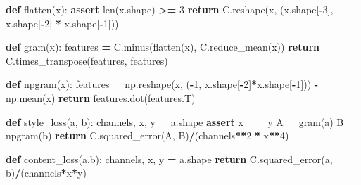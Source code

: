 \documentclass[]{book}
\newenvironment{Shaded}{\begin{snugshade}}{\end{snugshade}}
\newcommand{\KeywordTok}[1]{\textcolor[rgb]{0.13,0.29,0.53}{\textbf{#1}}}
\newcommand{\DecValTok}[1]{\textcolor[rgb]{0.00,0.00,0.81}{#1}}
\newcommand{\ControlFlowTok}[1]{\textcolor[rgb]{0.13,0.29,0.53}{\textbf{#1}}}
\newcommand{\OperatorTok}[1]{\textcolor[rgb]{0.81,0.36,0.00}{\textbf{#1}}}
\newcommand{\BuiltInTok}[1]{#1}
\newcommand{\NormalTok}[1]{#1}
\theoremstyle{definition}
\theoremstyle{definition}
\theoremstyle{definition}
\theoremstyle{remark}
\begin{document}
\begin{Shaded}
\begin{Highlighting}[]
\KeywordTok{def}\NormalTok{ flatten(x):}
    \ControlFlowTok{assert} \BuiltInTok{len}\NormalTok{(x.shape) }\OperatorTok{>=} \DecValTok{3}
    \ControlFlowTok{return}\NormalTok{ C.reshape(x, (x.shape[}\OperatorTok{-}\DecValTok{3}\NormalTok{], x.shape[}\OperatorTok{-}\DecValTok{2}\NormalTok{] }\OperatorTok{*}\NormalTok{ x.shape[}\OperatorTok{-}\DecValTok{1}\NormalTok{]))}


\KeywordTok{def}\NormalTok{ gram(x):}
\NormalTok{    features }\OperatorTok{=}\NormalTok{ C.minus(flatten(x), C.reduce_mean(x))}
    \ControlFlowTok{return}\NormalTok{ C.times_transpose(features, features)}


\KeywordTok{def}\NormalTok{ npgram(x):}
\NormalTok{    features }\OperatorTok{=}\NormalTok{ np.reshape(x, (}\OperatorTok{-}\DecValTok{1}\NormalTok{, x.shape[}\OperatorTok{-}\DecValTok{2}\NormalTok{]}\OperatorTok{*}\NormalTok{x.shape[}\OperatorTok{-}\DecValTok{1}\NormalTok{])) }\OperatorTok{-}\NormalTok{ np.mean(x)}
    \ControlFlowTok{return}\NormalTok{ features.dot(features.T)}


\KeywordTok{def}\NormalTok{ style_loss(a, b):}
\NormalTok{    channels, x, y }\OperatorTok{=}\NormalTok{ a.shape}
    \ControlFlowTok{assert}\NormalTok{ x }\OperatorTok{==}\NormalTok{ y}
\NormalTok{    A }\OperatorTok{=}\NormalTok{ gram(a)}
\NormalTok{    B }\OperatorTok{=}\NormalTok{ npgram(b)}
    \ControlFlowTok{return}\NormalTok{ C.squared_error(A, B)}\OperatorTok{/}\NormalTok{(channels}\OperatorTok{**}\DecValTok{2} \OperatorTok{*}\NormalTok{ x}\OperatorTok{**}\DecValTok{4}\NormalTok{)}


\KeywordTok{def}\NormalTok{ content_loss(a,b):}
\NormalTok{    channels, x, y }\OperatorTok{=}\NormalTok{ a.shape}
    \ControlFlowTok{return}\NormalTok{ C.squared_error(a, b)}\OperatorTok{/}\NormalTok{(channels}\OperatorTok{*}\NormalTok{x}\OperatorTok{*}\NormalTok{y)}



\end{Highlighting}
\end{Shaded}
\end{document}
